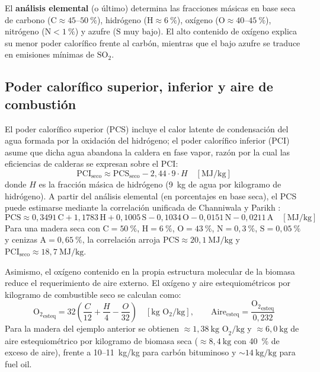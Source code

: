 El \textbf{análisis elemental} (o último) determina las fracciones másicas en base seca de carbono ($\mathrm{C} \approx 45\text{--}50~\%$), hidrógeno ($\mathrm{H} \approx 6~\%$), oxígeno ($\mathrm{O} \approx 40\text{--}45~\%$), nitrógeno ($\mathrm{N} < 1~\%$) y azufre ($\mathrm{S}$ muy bajo). El alto contenido de oxígeno explica su menor poder calorífico frente al carbón, mientras que el bajo azufre se traduce en emisiones mínimas de $\mathrm{SO_2}$.

\subsection{Poder calorífico superior, inferior y aire de combustión}
El poder calorífico superior (PCS) incluye el calor latente de condensación del agua formada por la oxidación del hidrógeno; el poder calorífico inferior (PCI) asume que dicha agua abandona la caldera en fase vapor, razón por la cual las eficiencias de calderas se expresan sobre el PCI:
\begin{equation}
\mathrm{PCI}_{\text{seco}} \approx \mathrm{PCS}_{\text{seco}} - 2{,}44 \cdot 9 \cdot H \quad [\text{MJ/kg}]
\end{equation}
donde $H$ es la fracción másica de hidrógeno (9~kg de agua por kilogramo de hidrógeno). A partir del análisis elemental (en porcentajes en base seca), el PCS puede estimarse mediante la correlación unificada de Channiwala y Parikh \cite{channiwala2002hhv}:
\begin{equation}
\mathrm{PCS} \approx 0{,}3491\,\mathrm{C} + 1{,}1783\,\mathrm{H} + 0{,}1005\,\mathrm{S} - 0{,}1034\,\mathrm{O} - 0{,}0151\,\mathrm{N} - 0{,}0211\,\mathrm{A} \quad [\text{MJ/kg}]
\end{equation}
Para una madera seca con $\mathrm{C} = 50~\%$, $\mathrm{H} = 6~\%$, $\mathrm{O} = 43~\%$, $\mathrm{N} = 0{,}3~\%$, $\mathrm{S} = 0{,}05~\%$ y cenizas $\mathrm{A} = 0{,}65~\%$, la correlación arroja $\mathrm{PCS} \approx 20{,}1~\text{MJ/kg}$ y $\mathrm{PCI}_{\text{seco}} \approx 18{,}7~\text{MJ/kg}$.

Asimismo, el oxígeno contenido en la propia estructura molecular de la biomasa reduce el requerimiento de aire externo. El oxígeno y aire estequiométricos por kilogramo de combustible seco se calculan como:
\begin{equation}
\mathrm{O_2}_{\text{esteq}} = 32 \left(\frac{C}{12} + \frac{H}{4} - \frac{O}{32}\right) \quad [\text{kg }\mathrm{O_2}/\text{kg}], \qquad \mathrm{Aire}_{\text{esteq}} = \frac{\mathrm{O_2}_{\text{esteq}}}{0{,}232}
\end{equation}
Para la madera del ejemplo anterior se obtienen $\approx 1{,}38~\text{kg O}_2/\text{kg}$ y $\approx 6{,}0~\text{kg}$ de aire estequiométrico por kilogramo de biomasa seca ($\approx 8{,}4~\text{kg}$ con 40~\% de exceso de aire), frente a 10--11~kg/kg para carbón bituminoso y $\sim 14~\text{kg/kg}$ para fuel oil.

